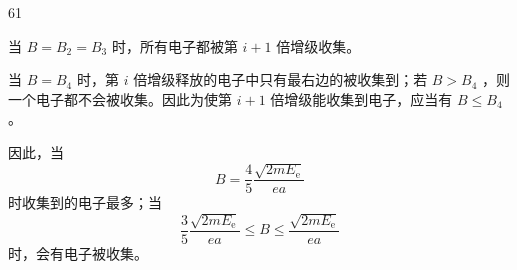 \begin{solution}{61}
\begin{subsolution}
        当 $B = B_{2} = B_{3}$ 时，所有电子都被第 $i + 1$ 倍增级收集。

        当 $B = B_{4}$ 时，第 $i$ 倍增级释放的电子中只有最右边的被收集到；若 $B > B_{4}$ ，则一个电子都不会被收集。因此为使第 $i + 1$ 倍增级能收集到电子，应当有 $B \leq B_{4}$ 。

        因此，当
        \begin{equation}
            B = \frac {4}{5} \frac {\sqrt {2 m E _ {\mathrm{e}}}}{e a}
            \label{eq:17.s61}
        \end{equation}
        时收集到的电子最多；当
        \begin{equation}
            \frac {3}{5} \frac {\sqrt {2 m E _ {\mathrm{e}}}}{e a} \leq B \leq \frac {\sqrt {2 m E _ {\mathrm{e}}}}{e a}
            \label{eq:18.s61}
        \end{equation}
        时，会有电子被收集。
    \end{subsolution}
\end{solution}